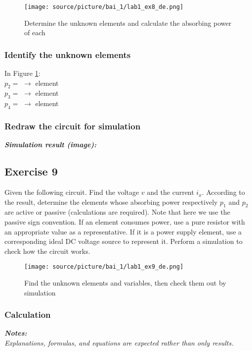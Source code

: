 \begin{figure}[H]
    \centering
    \texttt{[image: source/picture/bai\_1/lab1\_ex8\_de.png]}
    \caption{Determine the unknown elements and calculate the absorbing power of each}
    \label{lab1_ex8_de}
\end{figure}

\subsubsection{Identify the unknown elements}
In Figure \ref{lab1_ex8_de}:\bigskip\\
$p_2 =$ \dotfill $\longrightarrow$ \dotfill element\bigskip\\
$p_3 =$ \dotfill $\longrightarrow$ \dotfill element\bigskip\\
$p_4 =$ \dotfill $\longrightarrow$ \dotfill element\bigskip\\

\subsubsection{Redraw the circuit for simulation}
\textit{\textbf{Simulation result (image):}}
\newpage

\subsection{Exercise 9}
Given the following circuit. Find the voltage $v$ and the current $i_x$. According to the result, determine the elements whose absorbing power respectively $p_1$ and $p_2$ are active or passive (calculations are required). Note that here we use the passive sign convention. If an element consumes power, use a pure resistor with an appropriate value as a representative. If it is a  power supply element, use a corresponding ideal DC voltage source to represent it. Perform a simulation to check how the circuit works.

\begin{figure}[H]
    \centering
    \texttt{[image: source/picture/bai\_1/lab1\_ex9\_de.png]}
    \caption{Find the unknown elements and variables, then check them out by simulation}
    \label{lab1_ex9_de}
\end{figure}

\subsubsection{Calculation}
\textit{\textbf{Notes:}}\\
\textit{Explanations, formulas, and equations are expected rather than only results.}\\


